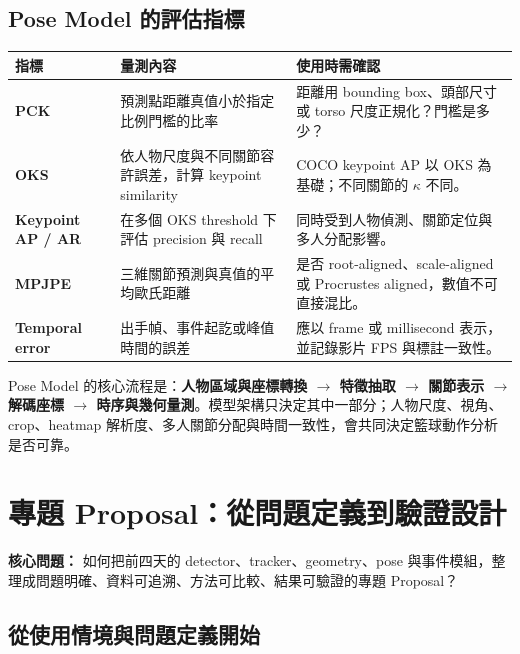 \documentclass[11pt,a4paper,oneside]{report}
\begin{document}
\section{Pose Model 的評估指標}

\begin{tabularx}{\textwidth}{>{\bfseries}p{3.0cm} Y Y}
\toprule
指標 & 量測內容 & 使用時需確認 \\
\midrule
PCK & 預測點距離真值小於指定比例門檻的比率 & 距離用 bounding box、頭部尺寸或 torso 尺度正規化？門檻是多少？\\
OKS & 依人物尺度與不同關節容許誤差，計算 keypoint similarity & COCO keypoint AP 以 OKS 為基礎；不同關節的 $\kappa$ 不同。\\
Keypoint AP / AR & 在多個 OKS threshold 下評估 precision 與 recall & 同時受到人物偵測、關節定位與多人分配影響。\\
MPJPE & 三維關節預測與真值的平均歐氏距離 & 是否 root-aligned、scale-aligned 或 Procrustes aligned，數值不可直接混比。\\
Temporal error & 出手幀、事件起訖或峰值時間的誤差 & 應以 frame 或 millisecond 表示，並記錄影片 FPS 與標註一致性。\\
\bottomrule
\end{tabularx}

\begin{takeawayBox}
Pose Model 的核心流程是：\textbf{人物區域與座標轉換 $\rightarrow$ 特徵抽取 $\rightarrow$ 關節表示 $\rightarrow$ 解碼座標 $\rightarrow$ 時序與幾何量測}。模型架構只決定其中一部分；人物尺度、視角、crop、heatmap 解析度、多人關節分配與時間一致性，會共同決定籃球動作分析是否可靠。
\end{takeawayBox}


\chapter{專題 Proposal：從問題定義到驗證設計}

\begin{heroBox}
\textbf{核心問題：}\quad
如何把前四天的 detector、tracker、geometry、pose 與事件模組，整理成問題明確、資料可追溯、方法可比較、結果可驗證的專題 Proposal？
\end{heroBox}

\section{從使用情境與問題定義開始}
\end{document}
